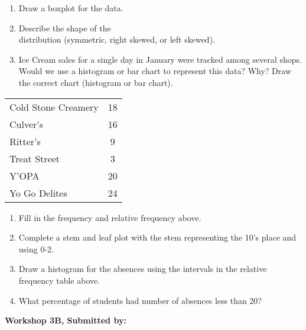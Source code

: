 \documentclass[11pt]{book}\usepackage[]{graphicx}\usepackage[]{color}
\begin{document}
\begin{exercises}
\begin{exercise}
\begin{minipage}[ht]{7cm}
{{\begin{enumerate}
  \item Draw a boxplot for the data.
  \item Describe the shape of the \\ distribution (symmetric, right skewed, or left skewed).
  \item Ice Cream sales for a single day in January were tracked among several shops.  Would we use a histogram or bar chart to represent this data?  Why?  Draw the correct chart (histogram or bar chart).
\end{enumerate}
}}

\end{minipage} \hfill
\begin{minipage}[bht]{7cm}

{\small{
\begin{tabular}{@{} lc @{}} \hline
Cold Stone Creamery	& 18 \\
Culver's &	16 \\
Ritter's &	9 \\
Treat Street &	3 \\
Y'OPA &	20 \\
Yo Go Delites &	24 \\ \hline
\end{tabular}
}}
\end{minipage}

\end{exercise}
\begin{solution} %

\begin{enumerate}
  \item	Fill in the frequency and relative frequency above.
  \item	Complete a stem and leaf plot with the stem representing the 10's place and using 0-2.
  \item	Draw a histogram for the absences using the intervals in the relative frequency table above.
  \item	What percentage of students had number of absences less than 20?
\end{enumerate}

    \end{solution}

\clearpage

    \begin{exercise}  %

    \begin{center}
\begin{flushleft}\textbf{\large \hfill Workshop 3B, Submitted by: }\end{flushleft}


\end{center}
\end{exercise}
\end{exercises}
\end{document}
